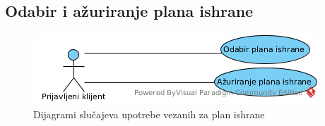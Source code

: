\subsection{Odabir i ažuriranje plana ishrane}

\begin{figure}[H]
\begin{center}
\includegraphics[width=\textwidth]{Pictures/uc_meal_plan.png}
\end{center}
    \caption{Dijagrami slučajeva upotrebe vezanih za plan ishrane}
\label{fig:UCMealPlan}
\end{figure}



